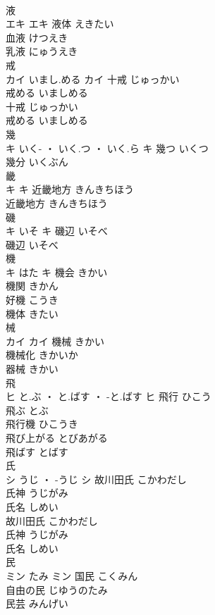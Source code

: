 \documentclass[8pt]{extreport}
\begin{document}
\begin{CJK}{UTF8}{min}
\\	液	
\\	エキ		エキ	液体	えきたい	
\\	血液	けつえき	
\\	乳液	にゅうえき	
\\	戒	
\\	カイ	いまし.める	カイ	十戒	じゅっかい	
\\	戒める	いましめる	
\\	十戒	じゅっかい	
\\	戒める	いましめる	
\\	幾	
\\	キ	いく- ・ いく.つ ・ いく.ら	キ	幾つ	いくつ	
\\	幾分	いくぶん	
\\	畿	
\\	キ		キ	近畿地方	きんきちほう	
\\	近畿地方	きんきちほう	
\\	磯	
\\	キ	いそ	キ	磯辺	いそべ	
\\	磯辺	いそべ	
\\	機	
\\	キ	はた	キ	機会	きかい	
\\	機関	きかん	
\\	好機	こうき	
\\	機体	きたい	
\\	械	
\\	カイ		カイ	機械	きかい	
\\	機械化	きかいか	
\\	器械	きかい	
\\	飛	
\\	ヒ	と.ぶ ・ と.ばす ・ -と.ばす	ヒ	飛行	ひこう	
\\	飛ぶ	とぶ	
\\	飛行機	ひこうき	
\\	飛び上がる	とびあがる	
\\	飛ばす	とばす	
\\	氏	
\\	シ	うじ ・ -うじ	シ	故川田氏	こかわだし	
\\	氏神	うじがみ	
\\	氏名	しめい	
\\	故川田氏	こかわだし	
\\	氏神	うじがみ	
\\	氏名	しめい	
\\	民	
\\	ミン	たみ	ミン	国民	こくみん	
\\	自由の民	じゆうのたみ	
\\	民芸	みんげい	

\end{CJK}
\end{document}
